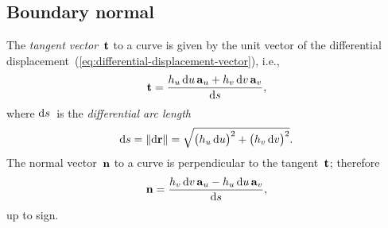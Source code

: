 \subsection{Boundary normal}
\label{sec:curvilinear.calculus.normal}

The \emph{tangent vector}~$\mathop{}\!\boldsymbol{\mathrm{t}}$ to a curve
is given by the unit vector of
the differential displacement~(\ref{eq:differential-displacement-vector}),
i.e.,
\begin{equation}
  \tangentvec =
    \frac{
      \scalefac{u} \td u \basisvec{u}
        +
      \scalefac{v} \td v \basisvec{v}
    }{
      \td s
    },
  \label{eq:tangent-vector}
\end{equation}
where $\mathop{}\!\mathrm{d} s$~is the \emph{differential arc length}
\begin{equation}
  \td s = \norm{\td \vec{r}} =
  \sqrt{
    \roundbr[\big]{\scalefac{u} \td u}^2
      +
    \roundbr[\big]{\scalefac{v} \td v}^2
  }.
  \label{eq:differential-arc-length}
\end{equation}
The normal vector~$\mathop{}\!\boldsymbol{\mathrm{n}}$ to a curve
is perpendicular to the tangent~$\mathop{}\!\boldsymbol{\mathrm{t}}$;
therefore
\begin{equation}
  \normalvec =
    \frac{
      \scalefac{v} \td v \basisvec{u}
        -
      \scalefac{u} \td u \basisvec{v}
    }{
      \td s
    },
  \label{eq:normal-vector}
\end{equation}
up to sign.
